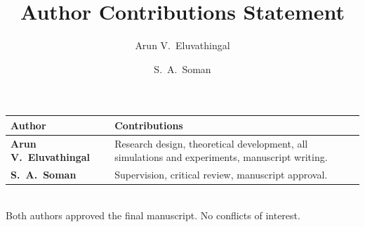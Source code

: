\documentclass[11pt,a4paper]{article}
\title{Author Contributions Statement}
\author{Arun V.\ Eluvathingal \and S.\ A.\ Soman}
\date{}
\begin{document}
\maketitle\thispagestyle{empty}
\begin{tabular}{@{}>{\bfseries}p{3.8cm}p{10cm}@{}}
\toprule
Author & Contributions \\ \midrule
Arun V.\ Eluvathingal & Research design, theoretical development, all simulations and experiments, manuscript writing. \\[6pt]
S.\ A.\ Soman & Supervision, critical review, manuscript approval. \\
\bottomrule
\end{tabular}\\[8pt]
Both authors approved the final manuscript. No conflicts of interest.
\end{document}
